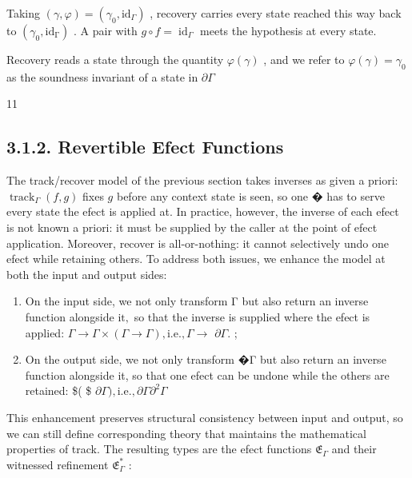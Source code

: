 \documentclass[
  10
]{article}
\begin{document}
Taking
\(( \gamma , \varphi ) = ( \gamma _ { 0 } , \mathrm { i d } _ { \Gamma } )\)
, recovery carries every state reached this way back to
\(( \gamma _ { 0 } , \mathrm { i d _ { \Gamma } } )\) . A pair with
\(g \circ f = \operatorname { i d } _ { \Gamma }\) meets the hypothesis
at every state.

Recovery reads a state through the quantity \(\varphi ( \gamma )\) , and
we refer to \(\varphi ( \gamma ) = \gamma _ { 0 }\) as the soundness
invariant of a state in \(\partial \Gamma\)

11

\subsection{3.1.2. Revertible Efect
Functions}\label{revertible-efect-functions}

The track/recover model of the previous section takes inverses as given
a priori: \(\operatorname { t r a c k } _ { \Gamma } ( f , g )\) fixes
\(g\) before any context state is seen, so one � has to serve every
state the efect is applied at. In practice, however, the inverse of each
efect is not known a priori: it must be supplied by the caller at the
point of efect application. Moreover, recover is all-or-nothing: it
cannot selectively undo one efect while retaining others. To address
both issues, we enhance the model at both the input and output sides:

\begin{enumerate}
\def\labelenumi{\arabic{enumi}.}
\item
  On the input side, we not only transform Γ but also return an inverse
  function alongside \({ \mathrm { i t } } ,\) so that the inverse is
  supplied where the efect is applied:
  \(\Gamma \to \Gamma \times ( \Gamma \to \Gamma ) , { \mathrm { i . e . } } , \Gamma \to\)
  \(\partial \Gamma .\) ;
\item
  On the output side, we not only transform �Γ but also return an
  inverse function alongside it, so that one efect can be undone while
  the others are retained: \$\partial \Gamma  \partial \Gamma \times (
  \partial \Gamma \$
  \(\partial \Gamma ) , \mathrm { i . e . , } \partial \Gamma  \partial ^ { 2 } \Gamma\)
\end{enumerate}

This enhancement preserves structural consistency between input and
output, so we can still define corresponding theory that maintains the
mathematical properties of track. The resulting types are the efect
functions \(\mathfrak { E } _ { \Gamma }\) and their witnessed
refinement \({ \mathfrak { E } } _ { \Gamma } ^ { * }\) :
\end{document}
